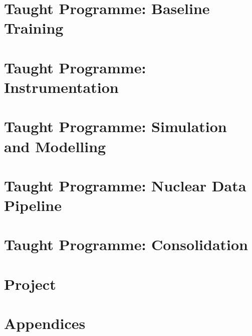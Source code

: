 \documentclass[hidelinks,
pdfpagelabels,
plainpages=false,
hypertexnames=false,
linktoc=all,
12pt]
{report}
\begin{document}

\tableofcontents


\part{Taught Programme: Baseline Training}
\pagestyle{fancy}
\fancyhead{}
%









\part{Taught Programme: Instrumentation}


\part{Taught Programme: Simulation and Modelling}


\part{Taught Programme: Nuclear Data Pipeline}

\part{Taught Programme: Consolidation}


\part{Project}

\part{Appendices}

\end{document}

